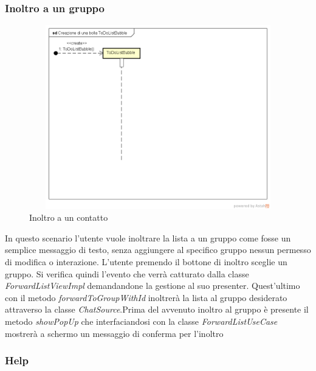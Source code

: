 \subsubsection{Inoltro a un gruppo}

\label{Inoltro a un contatto}
\begin{figure}[ht]
	\centering
	\includegraphics[width=12cm, height=8cm]{Sezioni/Diagrammi/img/Creazione di una bolla ToDoListBubble.png}
	\caption{Inoltro a un contatto}
	
\end{figure}

In questo scenario l'utente vuole inoltrare la lista a un gruppo come fosse un semplice messaggio di testo, senza aggiungere al specifico gruppo nessun permesso di modifica o interazione. L'utente premendo il bottone di inoltro sceglie un gruppo. Si verifica quindi l'evento che verrà catturato dalla classe \textit{ForwardListViewImpl} demandandone la gestione al suo presenter.
Quest'ultimo con il metodo \textit{forwardToGroupWithId} inoltrerà la lista al gruppo desiderato attraverso la classe \textit{ChatSource}.Prima del avvenuto inoltro al gruppo è presente il metodo \textit{showPopUp} che interfaciandosi con la classe \textit{ForwardListUseCase} mostrerà a schermo un messaggio di conferma per l'inoltro 


\subsubsection{Help}


